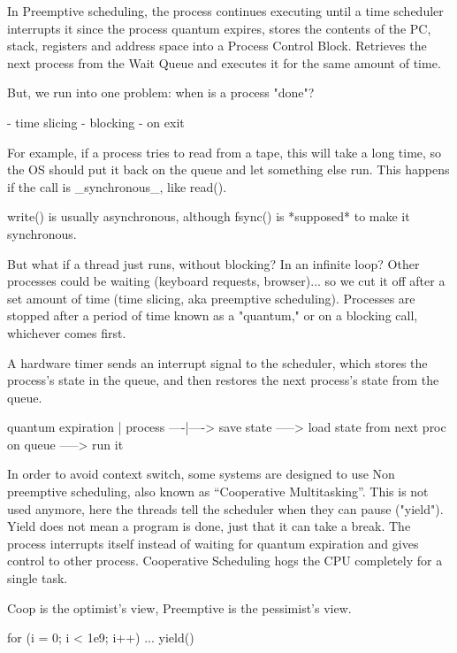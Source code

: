 \documentclass[twoside]{article}
\begin{document}
In Preemptive scheduling, the process continues executing until a time scheduler interrupts it since the process quantum expires, stores the contents of the PC, stack, registers and address space into a Process Control Block. Retrieves the next process from the Wait Queue and executes it for the same amount of time.

But, we run into one problem: when is a process "done"?

- time slicing \newline 
- blocking \newline 
- on exit \newline 

For example, if a process tries to read from a tape, this will take a long time, so the OS should put it back on the queue and let something else run. This happens if the call is \_synchronous\_, like read().

write() is usually asynchronous, although fsync() is *supposed* to make it synchronous.

But what if a thread just runs, without blocking? In an infinite loop? Other processes could be waiting (keyboard requests, browser)... so we cut it off after a set amount of time (time slicing, aka preemptive scheduling). Processes are stopped after a period of time known as a "quantum," or on a blocking call, whichever comes first.

A hardware timer sends an interrupt signal to the scheduler, which stores the process's state in the queue, and then restores the next process's state from the queue.

     quantum expiration\newline 
            |
process ----|----> save state -----> load state from next proc on queue -----> run it


In order to avoid context switch, some systems are designed to use Non preemptive scheduling, also known as “Cooperative Multitasking”.  This is not used anymore, here the threads tell the scheduler when they can pause ("yield"). Yield does not mean a program is done, just that it can take a break. The process interrupts itself instead of waiting for quantum expiration and gives control to other process. Cooperative Scheduling hogs the CPU completely for a single task.

Coop is the optimist's view, Preemptive is the pessimist's view.

for (i = 0; i < 1e9; i++)\newline
  ... \newline
  yield() \newline
\end{document}
